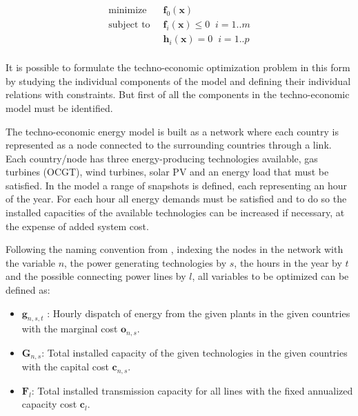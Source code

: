 \begin{equation}\label{eq:ConvexOptimization}
\begin{split}
\text{minimize} \;&\; \mathbf{f}_0(\mathbf{x})   \; \\
\text{subject to} \; &\; \mathbf{f}_i(\mathbf{x}) \leq 0 \; \; i=1..m\\
\;            &\;  \mathbf{h}_i(\mathbf{x}) = 0 \; \; i=1..p\\
\end{split}
\end{equation}

It is possible to formulate the techno-economic optimization problem in this form by studying the individual components of the model and defining their individual relations with constraints. But first of all the components in the techno-economic model must be identified. 

The techno-economic energy model is built as a network where each country is represented as a node connected to the surrounding countries through a link. Each country/node has three energy-producing technologies available, gas turbines (OCGT), wind turbines, solar PV and an energy load that must be satisfied. In the model a range of snapshots is defined, each representing an hour of the year. For each hour all energy demands must be satisfied and to do so the installed capacities of the available technologies can be increased if necessary, at the expense of added system cost. 

Following the naming convention from \cite{PyPSA_euro_30_model}, indexing the nodes in the network with the variable $n$, the power generating technologies by $s$, the hours in the year by $t$ and the possible connecting power lines by $l$, all variables to be optimized can be defined as: 

\begin{itemize}
	\item $\mathbf{g}_{n,s,t}$ : Hourly dispatch of energy from the given plants in the given countries with the marginal cost $\mathbf{o}_{n,s}$.
	\item $\mathbf{G}_{n,s}$: Total installed capacity of the given technologies in the given countries  with the capital cost $\mathbf{c}_{n,s}$.
	\item $\mathbf{F}_{l}$: Total installed transmission capacity for all lines with the fixed annualized capacity cost $\mathbf{c}_{l}$.
\end{itemize}



